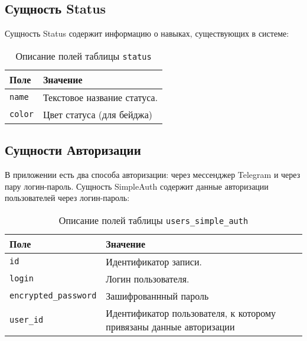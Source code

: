 \subsection{Сущность Status}
Сущность Status содержит информацию о навыках, существующих в системе:
\begin{table}[!ht]
    \caption{Описание полей таблицы \texttt{status}}
    \label{tbl:status}
    \begin{center}
        \begin{tabular}{|p{}p{}|}
            \hline
            \textbf{Поле} & \textbf{Значение} \\\hline
            \texttt{name} & Текстовое название статуса. \\\hline
            \texttt{color} & Цвет статуса (для бейджа) \\\hline
        \end{tabular}
    \end{center}
\end{table}
\newpage
\subsection{Сущности Авторизации}
В приложении есть два способа авторизации: через мессенджер Telegram\cite{telegram} и через пару логин-пароль.  
Сущность SimpleAuth содержит данные авторизации пользователей через логин-пароль:
\begin{table}[!ht]
    \caption{Описание полей таблицы \texttt{users\_simple\_auth}}
    \label{tbl:users_simple_auth}
    \begin{center}
        \begin{tabular}{|p{}p{}|}
            \hline
            \textbf{Поле} & \textbf{Значение} \\\hline
            \texttt{id} & Идентификатор записи. \\\hline
            \texttt{login} & Логин пользователя. \\\hline
            \texttt{encrypted\_password} & Зашифрованнный пароль \\\hline
            \texttt{user\_id} & Идентификатор пользователя, к которому привязаны данные авторизации \\\hline
        \end{tabular}
    \end{center}
\end{table}

